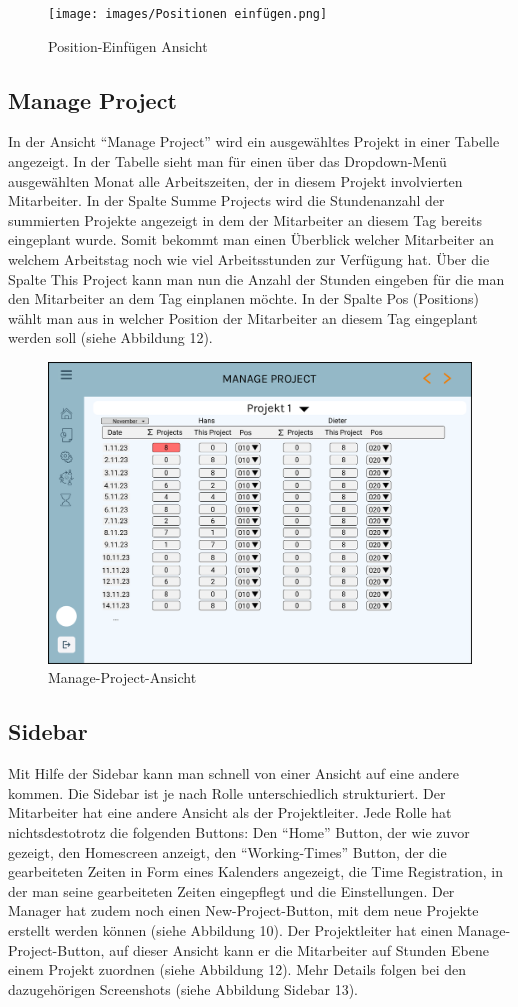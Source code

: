 \documentclass{article}
\begin{document}
\begin{figure}[h]
    \texttt{[image: images/Positionen einfügen.png]}
    \caption{Position-Einfügen Ansicht}
    \label{fig:beispiel}
\end{figure}

\subsection{Manage Project}
In der Ansicht “Manage Project” wird ein ausgewähltes Projekt in einer Tabelle
angezeigt. In der Tabelle sieht man für einen über das Dropdown-Menü ausgewählten
Monat alle Arbeitszeiten, der in diesem Projekt involvierten Mitarbeiter.
In der Spalte Summe Projects wird die Stundenanzahl der summierten Projekte
angezeigt in dem der Mitarbeiter an diesem Tag bereits eingeplant wurde.
Somit bekommt man einen Überblick welcher Mitarbeiter an welchem Arbeitstag 
noch wie viel Arbeitsstunden zur Verfügung hat. Über die Spalte This Project
kann man nun die Anzahl der Stunden eingeben für die man den Mitarbeiter
an dem Tag einplanen möchte. In der Spalte Pos (Positions) wählt man aus 
in welcher Position der Mitarbeiter an diesem Tag eingeplant werden soll
(siehe Abbildung 12).


\begin{figure}[h]
    \includegraphics[height= 0.5\textwidth,width= \textwidth]{images/ManageProject1.png}
    \caption{Manage-Project-Ansicht}
    \label{fig:beispiel}
\end{figure}

\newpage

\subsection{Sidebar}
Mit Hilfe der Sidebar kann man schnell von einer Ansicht auf eine andere kommen.
Die Sidebar ist je nach Rolle unterschiedlich strukturiert. Der Mitarbeiter hat
eine andere Ansicht als der Projektleiter. Jede Rolle hat nichtsdestotrotz die
folgenden Buttons: Den “Home” Button, der wie zuvor gezeigt, den Homescreen
anzeigt, den “Working-Times” Button, der die gearbeiteten Zeiten in Form eines
Kalenders angezeigt, die Time Registration, in der man seine gearbeiteten
Zeiten eingepflegt und die Einstellungen. Der Manager hat zudem noch einen
New-Project-Button, mit dem neue Projekte erstellt werden können (siehe Abbildung
10). Der Projektleiter hat einen Manage-Project-Button, auf dieser Ansicht kann
er die Mitarbeiter auf Stunden Ebene einem Projekt zuordnen (siehe Abbildung 12).
Mehr Details folgen bei den dazugehörigen Screenshots (siehe Abbildung Sidebar 13).
\end{document}
